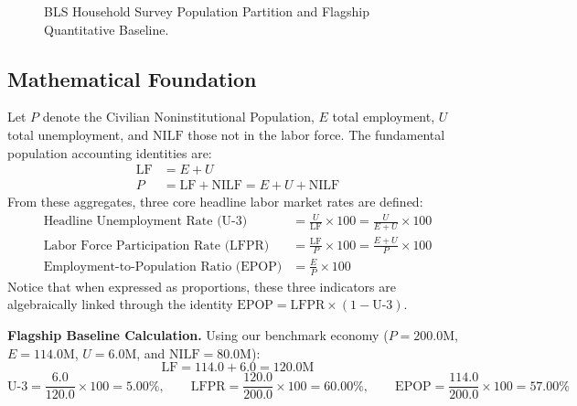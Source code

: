\documentclass[11pt, a4paper]{article}
\begin{document}
\begin{figure}[htbp]
\caption{BLS Household Survey Population Partition and Flagship Quantitative Baseline.}
\label{fig:bls_tree}
\end{figure}

\subsection*{Mathematical Foundation}
Let $P$ denote the Civilian Noninstitutional Population, $E$ total employment, $U$ total unemployment, and $\text{NILF}$ those not in the labor force. The fundamental population accounting identities are:
\begin{align}
  \text{LF} &= E + U \label{eq:lf_identity} \\
  P &= \text{LF} + \text{NILF} = E + U + \text{NILF} \label{eq:cnip_identity}
\end{align}
From these aggregates, three core headline labor market rates are defined:
\begin{align}
  \text{Headline Unemployment Rate (U-3)} &= \frac{U}{\text{LF}} \times 100 = \frac{U}{E + U} \times 100 \label{eq:u3} \\
  \text{Labor Force Participation Rate (LFPR)} &= \frac{\text{LF}}{P} \times 100 = \frac{E + U}{P} \times 100 \label{eq:lfpr} \\
  \text{Employment-to-Population Ratio (EPOP)} &= \frac{E}{P} \times 100 \label{eq:epop}
\end{align}
Notice that when expressed as proportions, these three indicators are algebraically linked through the identity $\text{EPOP} = \text{LFPR} \times (1 - \text{U-3})$.

\textbf{Flagship Baseline Calculation.} Using our benchmark economy ($P = 200.0\text{M}$, $E = 114.0\text{M}$, $U = 6.0\text{M}$, and $\text{NILF} = 80.0\text{M}$):
\[
  \text{LF} = 114.0 + 6.0 = 120.0\text{M}
\]
\[
  \text{U-3} = \frac{6.0}{120.0} \times 100 = 5.00\%, \qquad
  \text{LFPR} = \frac{120.0}{200.0} \times 100 = 60.00\%, \qquad
  \text{EPOP} = \frac{114.0}{200.0} \times 100 = 57.00\%
\]
\end{document}
